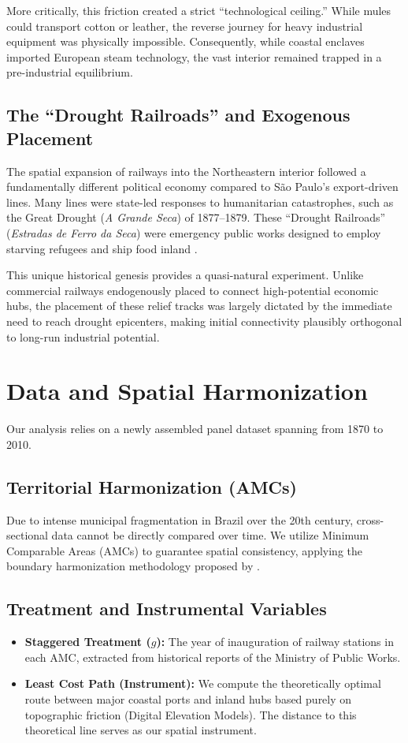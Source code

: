 \documentclass[11pt, a4paper]{article}
\begin{document}
More critically, this friction created a strict ``technological ceiling.'' While mules could transport cotton or leather, the reverse journey for heavy industrial equipment was physically impossible. Consequently, while coastal enclaves imported European steam technology, the vast interior remained trapped in a pre-industrial equilibrium.

\subsection{The ``Drought Railroads'' and Exogenous Placement}
The spatial expansion of railways into the Northeastern interior followed a fundamentally different political economy compared to São Paulo's export-driven lines. Many lines were state-led responses to humanitarian catastrophes, such as the Great Drought (\textit{A Grande Seca}) of 1877--1879. These ``Drought Railroads'' (\textit{Estradas de Ferro da Seca}) were emergency public works designed to employ starving refugees and ship food inland \citep{buckley2000}.

This unique historical genesis provides a quasi-natural experiment. Unlike commercial railways endogenously placed to connect high-potential economic hubs, the placement of these relief tracks was largely dictated by the immediate need to reach drought epicenters, making initial connectivity plausibly orthogonal to long-run industrial potential.

\section{Data and Spatial Harmonization}

Our analysis relies on a newly assembled panel dataset spanning from 1870 to 2010.

\subsection{Territorial Harmonization (AMCs)}
Due to intense municipal fragmentation in Brazil over the 20th century, cross-sectional data cannot be directly compared over time. We utilize Minimum Comparable Areas (AMCs) to guarantee spatial consistency, applying the boundary harmonization methodology proposed by \cite{ehrl2017}.

\subsection{Treatment and Instrumental Variables}
\begin{itemize}
    \item \textbf{Staggered Treatment ($g$):} The year of inauguration of railway stations in each AMC, extracted from historical reports of the Ministry of Public Works.
    \item \textbf{Least Cost Path (Instrument):} We compute the theoretically optimal route between major coastal ports and inland hubs based purely on topographic friction (Digital Elevation Models). The distance to this theoretical line serves as our spatial instrument.
\end{itemize}
\end{document}
